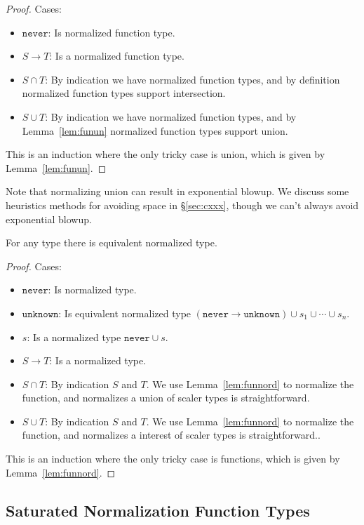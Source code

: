\documentclass[acmsmall,review,screen]{acmart}
\newcommand{\NEVER}{\mathtt{never}}
\newcommand{\UNKNOWN}{\mathtt{unknown}}
\newcommand{\fun}{\mathbin{\rightarrow}}
\begin{document}
\begin{proof}
  Cases:
  \begin{itemize}
  \item $\NEVER$: Is normalized function type.
  \item $S \fun T$: Is a normalized function type.
  \item $S \cap T$: By indication we have normalized function types,
    and by definition normalized function types support intersection.
  \item $S \cup T$: By indication we have normalized function types,
    and by Lemma~\ref{lem:funun} normalized function types support union.
  \end{itemize}
  This is an induction where the only tricky case is union, which is given by Lemma~\ref{lem:funun}.
\end{proof}
Note that normalizing union can result in exponential blowup.
We discuss some heuristics methods for avoiding space in \S\ref{sec:cxxx},
though we can't always avoid exponential blowup.

\begin{lemma}
  For any type there is equivalent normalized type.
\end{lemma}

\begin{proof}
  Cases:
  \begin{itemize}
  \item $\NEVER$: Is normalized type.
  \item $\UNKNOWN$: Is equivalent normalized type $(\NEVER \fun \UNKNOWN) \cup s_1 \cup \cdots \cup s_n$.
  \item $s$: Is a normalized type $\NEVER \cup s$.
  \item $S \fun T$: Is a normalized type.
  \item $S \cap T$: By indication $S$ and $T$. We use Lemma~\ref{lem:funnord}
    to normalize the function, and normalizes a union of scaler types is straightforward.
  \item $S \cup T$: By indication $S$ and $T$. We use Lemma~\ref{lem:funnord}
    to normalize the function, and normalizes a interest of scaler types is straightforward..
  \end{itemize}
  This is an induction where the only tricky case is functions, which is given by Lemma~\ref{lem:funnord}.
\end{proof}

\subsection{Saturated Normalization Function Types}
\label{subsec:saturated}
\end{document}
